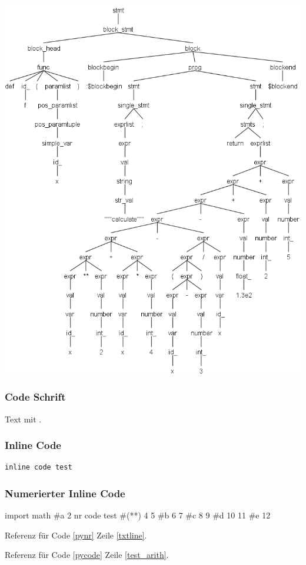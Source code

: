 \begin{center}
 \includegraphics[width=0.8\linewidth]{Bilder/program_func_parse_tree2.png}
  \label{g:tree}
\end{center}

%


\clearpage
\nocite{*}
\printbibliography



\subsubsection*{Code Schrift}
Text mit   .

\subsubsection*{Inline Code}
\begin{lstlisting}[caption=CAP]
inline code test
\end{lstlisting}

\vspace{4ex}
\subsubsection*{Numerierter Inline Code}
\begin{nrcode}[caption=CCC, label=pynr, linerange={a-c, d-e}]
import math
#\*a
2
nr code test #(*\label{txtline}*)
4
5
#\*b
6
7
#\*c
8
9
#\*d
10
11
#\*e
12
\end{nrcode}

Referenz für Code \ref{pynr} Zeile \ref{txtline}.

Referenz für Code \ref{pycode} Zeile \ref{test_arith}.
